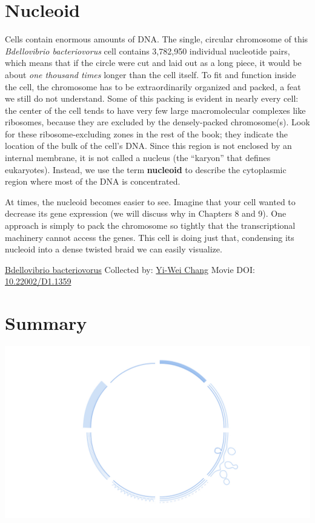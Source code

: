 \documentclass[]{tufte-book}
\begin{document}
\hypertarget{nucleoid}{%
\section{Nucleoid}\label{nucleoid}}

Cells contain enormous amounts of DNA. The single, circular chromosome of this \emph{Bdellovibrio bacteriovorus} cell contains 3,782,950 individual nucleotide pairs, which means that if the circle were cut and laid out as a long piece, it would be about \emph{one thousand times} longer than the cell itself. To fit and function inside the cell, the chromosome has to be extraordinarily organized and packed, a feat we still do not understand. Some of this packing is evident in nearly every cell: the center of the cell tends to have very few large macromolecular complexes like ribosomes, because they are excluded by the densely-packed chromosome(s). Look for these ribosome-excluding zones in the rest of the book; they indicate the location of the bulk of the cell's DNA. Since this region is not enclosed by an internal membrane, it is not called a nucleus (the ``karyon'' that defines eukaryotes). Instead, we use the term \textbf{nucleoid} to describe the cytoplasmic region where most of the DNA is concentrated.

At times, the nucleoid becomes easier to see. Imagine that your cell wanted to decrease its gene expression (we will discuss why in Chapters 8 and 9). One approach is simply to pack the chromosome so tightly that the transcriptional machinery cannot access the genes. This cell is doing just that, condensing its nucleoid into a dense twisted braid we can easily visualize.



\hypertarget{htmlwidget-b8ab18c64a4625923846}{}

\label{fig:2-10}\protect\hyperlink{tree}{Bdellovibrio bacteriovorus} Collected by: \protect\hyperlink{yi-wei_chang}{Yi-Wei Chang} Movie DOI: \href{https://doi.org/10.22002/D1.1359}{10.22002/D1.1359}

\hypertarget{summary-1}{%
\section{Summary}\label{summary-1}}

\includegraphics{img/summaries/02_Envelope}
\end{document}
